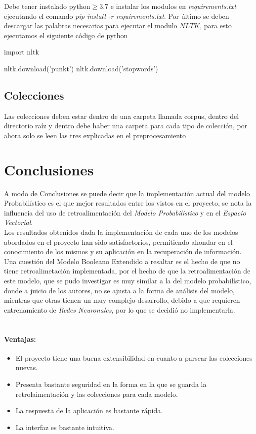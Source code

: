 \documentclass{llncs}
\begin{document}
	Debe tener instalado python$\geq$3.7 e instalar los modulos en \textit{requirements.txt} ejecutando el comando \textit{pip install -r requirements.txt}. Por \'ultimo se deben descargar las palabras necesarias para ejecutar el modulo $NLTK$, para esto ejecutamos el siguiente c\'odigo de python
	
	\begin{python}
	import nltk
	
	nltk.download('punkt')
	nltk.download('stopwords')
	\end{python}
	

    \subsection{Colecciones}
    
	Las colecciones deben estar dentro de una carpeta llamada corpus, dentro del directorio ra\'iz y dentro debe haber una carpeta para cada tipo de colecci\'on, por ahora solo se leen las tres explicadas en el preprocesamiento

	\section{Conclusiones}
	A modo de Conclusiones se puede decir que la implementaci\'on actual del modelo Probabil\'istico es el que mejor resultados entre los vistos en el proyecto, 
	se nota la influencia del uso de retroalimentaci\'on del \textit{Modelo Probabil\'istico} y en el \textit{Espacio Vectorial}. \\
	Los resultados obtenidos dada la implementaci\'on de cada uno de los modelos abordados en el proyecto han sido satisfactorios, permitiendo ahondar
	en el conocimiento de los mismos y su aplicaci\'on en la recuperaci\'on de informaci\'on.\\

	Una cuesti\'on del Modelo Booleano Extendido a resaltar es el hecho de que no tiene retroalimetaci\'on implementada, por el hecho de que
	la retroalimentaci\'on de este modelo, que se pudo investigar es muy similar a la del modelo probabil\'istico, donde a juicio de los autores, 
	no se ajusta a la forma de an\'alisis del modelo, mientras que otras tienen un muy complejo desarrollo,
	debido a que requieren entrenamiento de \textit{Redes Neuronales}, por lo que se decidi\'o no implementarla.\\
	\\

	\paragraph*{Ventajas:}
	\begin{itemize}
		\item El proyecto tiene una buena extensibilidad en cuanto a parsear las colecciones nuevas.
		\item Presenta bastante seguridad en la forma en la que se guarda la retrolaimentaci\'on y las colecciones para cada modelo.
		\item La respuesta de la aplicaci\'on es bastante r\'apida.
		\item La interfaz es bastante intuitiva.
	\end{itemize}
\end{document}
